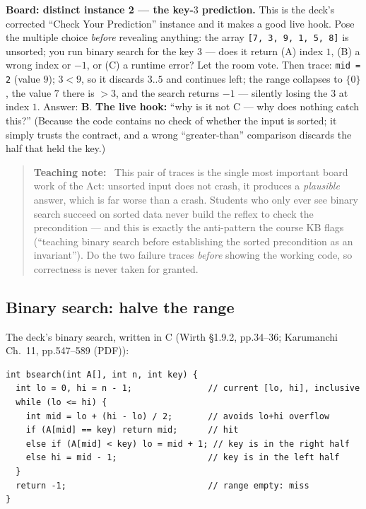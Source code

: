 \documentclass[11pt]{article}
\newenvironment{teachingaside}{\begin{quote}\small\color{primary-gold}\textbf{Teaching note:}\ }{\end{quote}}
\begin{document}
\textbf{Board: distinct instance 2 --- the key-$3$ prediction.} This is the deck's corrected ``Check Your Prediction'' instance and it makes a good live hook. Pose the multiple choice \emph{before} revealing anything: the array \texttt{[7, 3, 9, 1, 5, 8]} is unsorted; you run binary search for the key $3$ --- does it return (A) index $1$, (B) a wrong index or $-1$, or (C) a runtime error? Let the room vote. Then trace: \texttt{mid = 2} (value $9$); $3 < 9$, so it discards $3..5$ and continues left; the range collapses to $\{0\}$, the value $7$ there is $> 3$, and the search returns $-1$ --- silently losing the $3$ at index $1$. Answer: \textbf{B}. \textbf{The live hook:} ``why is it not C --- why does nothing catch this?'' (Because the code contains no check of whether the input is sorted; it simply trusts the contract, and a wrong ``greater-than'' comparison discards the half that held the key.)

\begin{teachingaside}
This pair of traces is the single most important board work of the Act: unsorted input does not crash, it produces a \emph{plausible} answer, which is far worse than a crash. Students who only ever see binary search succeed on sorted data never build the reflex to check the precondition --- and this is exactly the anti-pattern the course KB flags (``teaching binary search before establishing the sorted precondition as an invariant''). Do the two failure traces \emph{before} showing the working code, so correctness is never taken for granted.
\end{teachingaside}

\subsection{Binary search: halve the range}

The deck's binary search, written in C (Wirth \S1.9.2, pp.34--36; Karumanchi Ch.~11, pp.547--589 (PDF)):

{\footnotesize
\begin{verbatim}
int bsearch(int A[], int n, int key) {
  int lo = 0, hi = n - 1;               // current [lo, hi], inclusive
  while (lo <= hi) {
    int mid = lo + (hi - lo) / 2;       // avoids lo+hi overflow
    if (A[mid] == key) return mid;      // hit
    else if (A[mid] < key) lo = mid + 1; // key is in the right half
    else hi = mid - 1;                  // key is in the left half
  }
  return -1;                            // range empty: miss
}
\end{verbatim}
}
\end{document}
